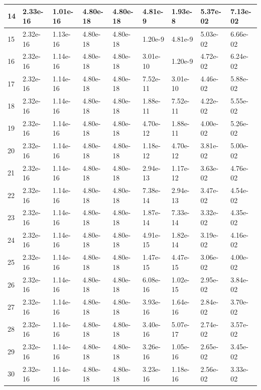 \documentclass[rocnikovka]{gzwroc} %
\begin{document}
\begin{table}[h!]
\begin{tabular}{|l|l|l|l|l|l|l|l|l|}
14 & 2.33e-16 & 1.01e-16 & 4.80e-18 & 4.80e-18 & 4.81e-9 & 1.93e-8 & 5.37e-02 & 7.13e-02 \\ \hline 
15 & 2.32e-16 & 1.13e-16 & 4.80e-18 & 4.80e-18 & 1.20e-9 & 4.81e-9 & 5.03e-02 & 6.66e-02 \\ \hline 
16 & 2.32e-16 & 1.14e-16 & 4.80e-18 & 4.80e-18 & 3.01e-10 & 1.20e-9 & 4.72e-02 & 6.24e-02 \\ \hline 
17 & 2.32e-16 & 1.14e-16 & 4.80e-18 & 4.80e-18 & 7.52e-11 & 3.01e-10 & 4.46e-02 & 5.88e-02 \\ \hline 
18 & 2.32e-16 & 1.14e-16 & 4.80e-18 & 4.80e-18 & 1.88e-11 & 7.52e-11 & 4.22e-02 & 5.55e-02 \\ \hline 
19 & 2.32e-16 & 1.14e-16 & 4.80e-18 & 4.80e-18 & 4.70e-12 & 1.88e-11 & 4.00e-02 & 5.26e-02 \\ \hline 
20 & 2.32e-16 & 1.14e-16 & 4.80e-18 & 4.80e-18 & 1.18e-12 & 4.70e-12 & 3.81e-02 & 5.00e-02 \\ \hline 
21 & 2.32e-16 & 1.14e-16 & 4.80e-18 & 4.80e-18 & 2.94e-13 & 1.17e-12 & 3.63e-02 & 4.76e-02 \\ \hline 
22 & 2.32e-16 & 1.14e-16 & 4.80e-18 & 4.80e-18 & 7.38e-14 & 2.94e-13 & 3.47e-02 & 4.54e-02 \\ \hline 
23 & 2.32e-16 & 1.14e-16 & 4.80e-18 & 4.80e-18 & 1.87e-14 & 7.33e-14 & 3.32e-02 & 4.35e-02 \\ \hline 
24 & 2.32e-16 & 1.14e-16 & 4.80e-18 & 4.80e-18 & 4.91e-15 & 1.82e-14 & 3.19e-02 & 4.16e-02 \\ \hline 
25 & 2.32e-16 & 1.14e-16 & 4.80e-18 & 4.80e-18 & 1.47e-15 & 4.47e-15 & 3.06e-02 & 4.00e-02 \\ \hline 
26 & 2.32e-16 & 1.14e-16 & 4.80e-18 & 4.80e-18 & 6.08e-16 & 1.02e-15 & 2.95e-02 & 3.84e-02 \\ \hline 
27 & 2.32e-16 & 1.14e-16 & 4.80e-18 & 4.80e-18 & 3.93e-16 & 1.64e-16 & 2.84e-02 & 3.70e-02 \\ \hline 
28 & 2.32e-16 & 1.14e-16 & 4.80e-18 & 4.80e-18 & 3.40e-16 & 5.07e-17 & 2.74e-02 & 3.57e-02 \\ \hline 
29 & 2.32e-16 & 1.14e-16 & 4.80e-18 & 4.80e-18 & 3.26e-16 & 1.05e-16 & 2.65e-02 & 3.45e-02 \\ \hline 
30 & 2.32e-16 & 1.14e-16 & 4.80e-18 & 4.80e-18 & 3.23e-16 & 1.18e-16 & 2.56e-02 & 3.33e-02 \\ \hline 
\end{tabular}
\end{table}
\end{document}
